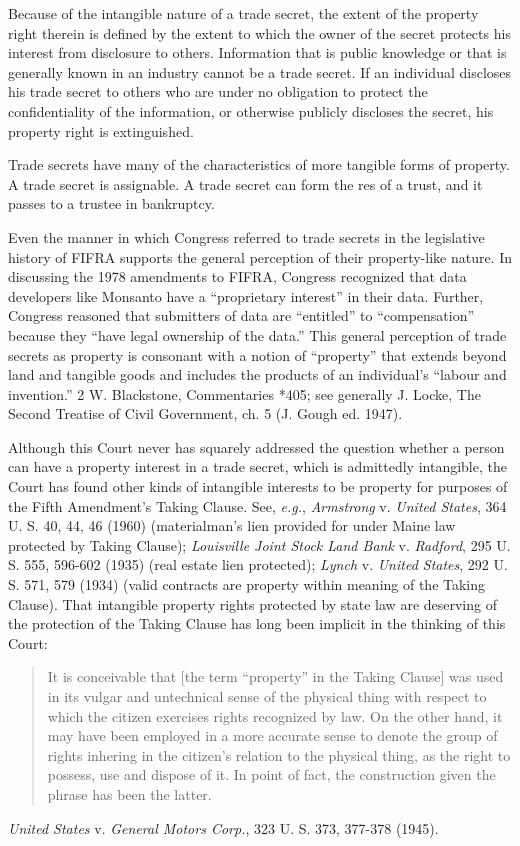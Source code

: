 Because of the intangible nature of a trade secret, the extent of the property
right therein is defined by the extent to which the owner of the secret protects
his interest from disclosure to others.
Information that is public knowledge or that is generally known in an
industry cannot be a trade secret. If an
individual discloses his trade secret to others who are under no obligation to
protect the confidentiality of the information, or otherwise publicly discloses
the secret, his property right is extinguished.

Trade secrets have many of the characteristics of more tangible forms of
property. A trade secret is assignable.
A trade secret can form the res of a trust,
and it passes to a trustee in bankruptcy.

Even the manner in which Congress referred to trade secrets in the legislative
history of FIFRA supports the general perception of their property-like nature.
In discussing the 1978 amendments to FIFRA, Congress recognized that data
developers like Monsanto have a ``proprietary interest'' in their data.
Further, Congress reasoned that submitters of data are
``entitled'' to ``compensation'' because they ``have legal ownership of the
data.'' This general
perception of trade secrets as property is consonant with a notion of
``property'' that extends beyond land and tangible goods and includes the
products of an individual's ``labour and invention.'' 2 W. Blackstone,
Commentaries *405; see generally J. Locke, The Second Treatise of Civil
Government, ch. 5 (J. Gough ed. 1947).

Although this Court never has squarely addressed the question whether a person
can have a property interest in a trade secret, which is admittedly intangible,
the Court has found other kinds of intangible interests to be property for
purposes of the Fifth Amendment's Taking Clause. See, \textit{e.g.},
\textit{Armstrong} v. \textit{United States}, 364 U. S. 40, 44, 46 (1960)
(materialman's lien provided for under Maine law protected by Taking Clause);
\textit{Louisville Joint Stock Land Bank} v. \textit{Radford}, 295 U. S. 555,
596-602 (1935) (real estate lien protected); \textit{Lynch} v. \textit{United
States}, 292 U. S. 571, 579 (1934) (valid contracts are property within meaning
of the Taking Clause). That intangible property rights protected by state law
are deserving of the protection of the Taking Clause has long been implicit in
the thinking of this Court:
\begin{quote}
It is conceivable that [the term ``property'' in the Taking
Clause] was used in its vulgar and untechnical sense of the physical thing with
respect to which the citizen exercises rights recognized by law. On the other
hand, it may have been employed in a more accurate sense to denote the group of
rights inhering in the citizen's relation to the physical thing, as the right to
possess, use and dispose of it. In point of fact, the construction given the
phrase has been the latter.
\end{quote}
\textit{United States} v. \textit{General Motors
Corp.}, 323 U. S. 373, 377-378 (1945).

